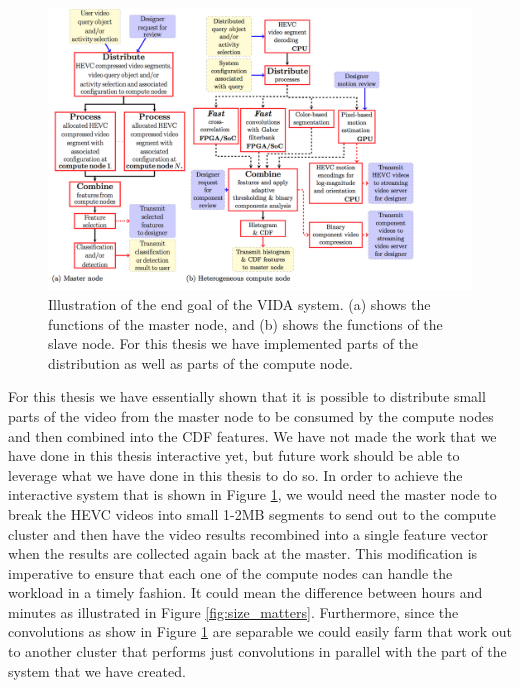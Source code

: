  \begin{figure}[h]
   \label{fig:full_system}
   \centering
   \includegraphics[width=\textwidth]{figures/full_system}
   \caption{Illustration of the end goal of the VIDA system. (a) shows the
   functions of the master node, and (b) shows the functions of the slave node.
   For this thesis we have implemented parts of the distribution as well as parts
   of the compute node.}
 \end{figure}

 \FloatBarrier

 For this thesis we have essentially shown that it is possible to distribute
 small parts of the video from the master node to be consumed by the compute nodes
 and then combined into the CDF features. We have not made the work that we have
 done in this thesis interactive yet, but future work should be able to leverage
 what we have done in this thesis to do so. In order to achieve the interactive
 system that is shown in Figure \ref{fig:full_system}, we would need the master
 node to break the HEVC videos into small 1-2MB segments to send out to the compute
 cluster and then have the video results recombined into a single feature vector
 when the results are collected again back at the master. This modification is
 imperative to ensure that each one of the compute nodes can handle the workload
 in a timely fashion. It could mean the difference between hours and minutes
 as illustrated in Figure \ref{fig:size_matters}. Furthermore, since the convolutions
 as show in Figure \ref{fig:full_system} are separable we could easily farm that
 work out to another cluster that performs just convolutions in parallel with
 the part of the system that we have created.
